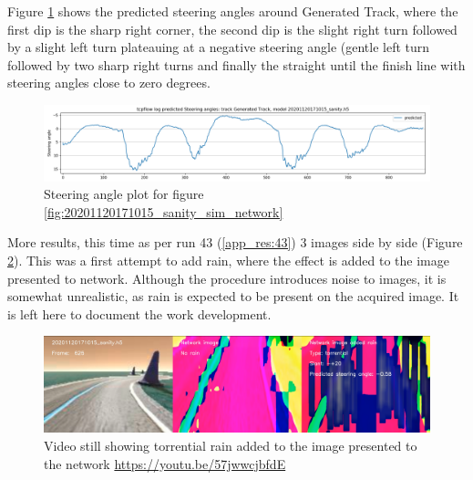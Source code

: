 Figure \ref{fig:sa_GeneratedTrack_20201120171015_sanity} shows the predicted steering angles around Generated Track, where the first dip is the sharp right corner, the second dip is the slight right turn followed by a slight left turn plateauing at a negative steering angle (gentle left turn followed by two sharp right turns and finally the straight until the finish line with steering angles close to zero degrees.
\begin{figure}[ht]
 \centering 
 \includegraphics[width=\textwidth]{Figures/sa_GeneratedTrack_20201120171015_sanity.h5.png}
 \caption{Steering angle plot for figure \ref{fig:20201120171015_sanity_sim_network}}
 \label{fig:sa_GeneratedTrack_20201120171015_sanity} 
\end{figure}
More results, this time as per run 43 (\ref{app_res:43}) 3 images side by side (Figure 
 \ref{fig:tcpflow_Run43}). This was a first attempt to add rain, where the effect is added to the image presented to network. Although the procedure introduces noise to images, it is somewhat unrealistic, as rain is expected to be present on the acquired image. It is left here to document the work development.
 
\begin{figure}[ht]
 \centering 
 \includegraphics[width=\textwidth]{Figures/tcpflow_Run43.png}
 \caption{Video still showing torrential rain added to the image presented to the network \href{https://youtu.be/57jwwcjbfdE}{https://youtu.be/57jwwcjbfdE}}
 \label{fig:tcpflow_Run43} 
\end{figure}

